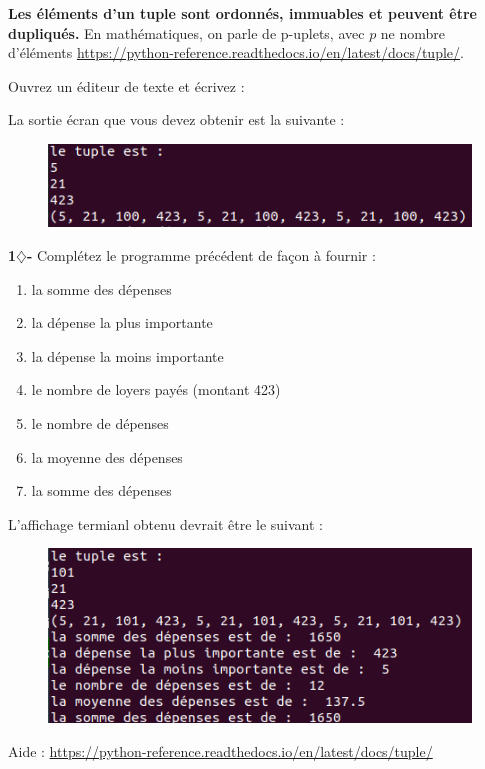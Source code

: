 \textbf{Les éléments d'un tuple sont ordonnés, immuables et peuvent être dupliqués.}
En mathématiques, on parle de p-uplets, avec $p$ ne nombre d'éléments \url{https://python-reference.readthedocs.io/en/latest/docs/tuple/}. 


Ouvrez un éditeur de texte et écrivez :



La sortie écran que vous devez obtenir est la suivante : 

\begin{figure}[H]
    \centering
    \includegraphics[scale = 0.5]{chapitre2/figures/tuple.png}
\end{figure}


\begin{tcolorbox}[lefttitle=2cm, colframe=gray!75!black, title= \textbf{Exercices}]
\textbf{1$\diamondsuit$-}
Complétez le programme précédent de façon à fournir :

\begin{enumerate}
    \item la somme des dépenses
    \item la dépense la plus importante
    \item la dépense la moins importante
    \item le nombre de loyers payés (montant 423)
    \item le nombre de dépenses
    \item la moyenne des dépenses
    \item la somme des dépenses
\end{enumerate}

L'affichage termianl obtenu devrait être le suivant :

\begin{figure}[H]
    \centering
    \includegraphics[scale = 0.6]{chapitre2/figures/tuple2.png}
\end{figure}

Aide : \url{https://python-reference.readthedocs.io/en/latest/docs/tuple/}

\end{tcolorbox}


